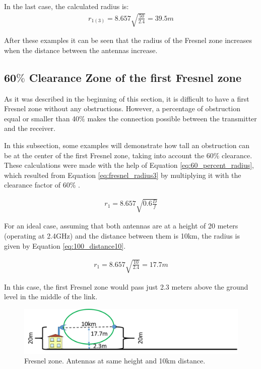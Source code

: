 In the last case, the calculated radius is:
\begin{align*}
r_{1(3)} = 8.657\sqrt{\frac{50}{2.4}} = 39.5m
\end{align*}

After these examples it can be seen that the radius of the Fresnel zone increases when the distance between the antennas increase.

\subsection*{60$\%$ Clearance Zone of the first Fresnel zone}
As it was described in the beginning of this section, it is difficult to have a first Fresnel zone without any obstructions. However, a percentage of obstruction equal or smaller than 40$\%$ makes the connection possible between the transmitter and the receiver.

In this subsection, some examples will demonstrate how tall an obstruction can be at the center of the first Fresnel zone, taking into account the 60$\%$ clearance. These calculations were made with the help of Equation \ref{eq:60_percent_radius}, which resulted from Equation \ref{eq:fresnel_radius3} by multiplying it with the clearance factor of 60$\%$ \cite{viasFresnel}.

\begin{align}
r_1 = 8.657\sqrt{0.6\frac{D}{f}}\label{eq:60_percent_radius}
\end{align}

For an ideal case, assuming that both antennas are at a height of 20 meters (operating at 2.4GHz) and the distance between them is 10km, the radius is given by Equation \ref{eq:100_distance10}.

\begin{align}
r_1 = 8.657\sqrt{\frac{10}{2.4}} = 17.7m\label{eq:100_distance10}
\end{align}

In this case, the first Fresnel zone would pass just 2.3 meters above the ground level in the middle of the link. 

\begin{figure}[H]
	\centering
	\includegraphics[scale=0.50]{figures/fresnel_10km_height.png}
	\caption{Fresnel zone. Antennas at same height and 10km distance.}
	\label{fig:fresnel_zones_10km_height}
\end{figure}  


